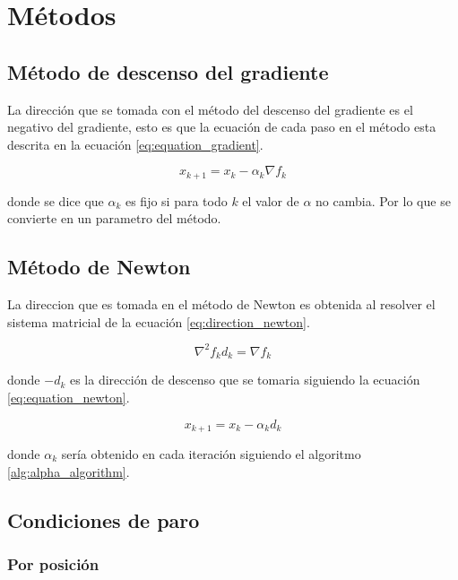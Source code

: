 \section{Métodos}

\subsection{Método de descenso del gradiente}

La dirección que se tomada con el método del descenso del gradiente es el negativo del gradiente, esto es que la ecuación de cada paso en el método esta descrita en la ecuación \ref{eq:equation_gradient}.

\begin{equation}
    x_{k+1} = x_{k} - \alpha_k \nabla f_k \label{eq:equation_gradient}
\end{equation}

donde se dice que $\alpha_k$ es fijo si para todo $k$ el valor de $\alpha$ no cambia. Por lo que se convierte en un parametro del método.

\subsection{Método de Newton}

La direccion que es tomada en el método de Newton es obtenida al resolver el sistema matricial de la ecuación \ref{eq:direction_newton}.

\begin{equation}
    \nabla^2 f_k d_k = \nabla f_k \label{eq:direction_newton}
\end{equation}

donde $-d_k$ es la dirección de descenso que se tomaria siguiendo la ecuación \ref{eq:equation_newton}.

\begin{equation}
    x_{k+1} = x_{k} - \alpha_k d_k \label{eq:equation_newton}
\end{equation}

donde $\alpha_k$ sería obtenido en cada iteración siguiendo el algoritmo \ref{alg:alpha_algorithm}.

\subsection{Condiciones de paro \label{sec:stop}}

\subsubsection{Por posición}


